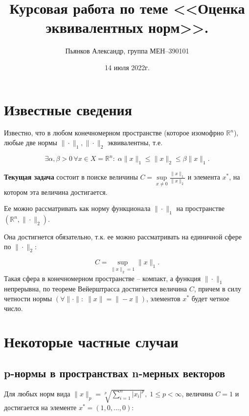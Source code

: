 \documentclass{article}
\begin{document}
\title{Курсовая работа по теме <<Оценка эквивалентных норм>>.}

\author{Пьянков Александр, группа МЕН--390101}

\date{14 июля 2022г.}

\maketitle

\tableofcontents

\newpage
\section{Известные сведения}

Известно, что в любом конечномерном пространстве (которое изомофрно $\mathbb{R}^n$), любые две нормы $\|\cdot\|_1, \|\cdot\|_2$ эквивалентны, т.е.

$$ \exists \alpha, \beta > 0 \, \forall x \in X = \mathbb{R}^n: \; \alpha\|x\|_1 \leq \|x\|_2 \leq \beta \|x\|_1. $$

\textbf{Текущая задача} состоит в поиске величины $ C = \sup\limits_{x \neq 0} \frac{\|x\|_1}{\|x\|_2}$ и элемента $x^*$, на котором эта величина достигается.

Ее можно рассматривать как норму функционала $\|\cdot\|_1$ на пространстве $(\mathbb{R}^n, \|\cdot\|_2).$

Она достигнется обязательно, т.к. ее можно рассматривать на единичной сфере по $\|\cdot\|_2$: 

$$ C = \sup\limits_{\|x\|_2=1}{\|x\|_1}. $$
Такая сфера в конечномерном пространстве -- компакт, а функция $\|\cdot\|_1$ непрерывна, по теореме Вейерштрасса достигнется величина $C$, причем в силу четности нормы $(\forall \|\cdot\|: \; \|x\| = \|-x\|)$, элементов $x^*$ будет четное число.

\newpage
\section{Некоторые частные случаи}

\subsection{p-нормы в пространствах n-мерных векторов}

Для любых норм вида $ \|x\|_p = \sqrt[p]{\sum\limits_{i=1}^n{|x_i|^p}}, \; 1 \leq p < \infty $, величина $C = 1$ и достигается на элементе $x^*=(1,0,...,0)$:
\end{document}
